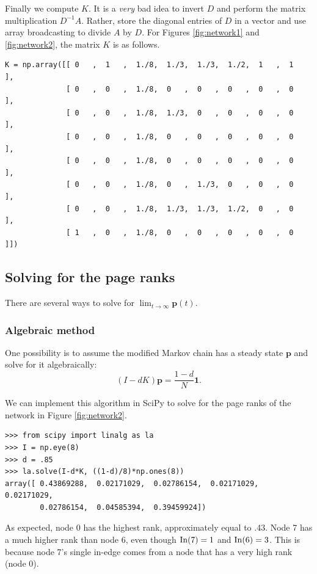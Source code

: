 Finally we compute $K$.
It is a \emph{very} bad idea to invert $D$ and perform the matrix multiplication $D^{-1}A$.
Rather, store the diagonal entries of $D$ in a vector and use array broadcasting to divide $A$ by $D$.
For Figures \ref{fig:network1} and \ref{fig:network2}, the matrix $K$ is as follows.

\begin{lstlisting}
K = np.array([[ 0   ,  1   ,  1./8,  1./3,  1./3,  1./2,  1   ,  1   ],
              [ 0   ,  0   ,  1./8,  0   ,  0   ,  0   ,  0   ,  0   ],
              [ 0   ,  0   ,  1./8,  1./3,  0   ,  0   ,  0   ,  0   ],
              [ 0   ,  0   ,  1./8,  0   ,  0   ,  0   ,  0   ,  0   ],
              [ 0   ,  0   ,  1./8,  0   ,  0   ,  0   ,  0   ,  0   ],
              [ 0   ,  0   ,  1./8,  0   ,  1./3,  0   ,  0   ,  0   ],
              [ 0   ,  0   ,  1./8,  1./3,  1./3,  1./2,  0   ,  0   ],
              [ 1   ,  0   ,  1./8,  0   ,  0   ,  0   ,  0   ,  0   ]])
\end{lstlisting}


\subsection*{Solving for the page ranks}
There are several ways to solve for $\lim_{t \to \infty} \mathbf{p}(t)$.
\subsubsection*{Algebraic method}
One possibility is to assume the modified Markov chain has a steady state $\mathbf{p}$ and solve for it algebraically:
\begin{equation}\label{equ:matrix_solve}
(I-dK)\mathbf{p} = \frac{1-d}{N} \mathbf{1}.
\end{equation}

We can implement this algorithm in SciPy to solve for the page ranks of the network in Figure \ref{fig:network2}.
\begin{lstlisting}
>>> from scipy import linalg as la
>>> I = np.eye(8)
>>> d = .85
>>> la.solve(I-d*K, ((1-d)/8)*np.ones(8))
array([ 0.43869288,  0.02171029,  0.02786154,  0.02171029,  0.02171029,
        0.02786154,  0.04585394,  0.39459924])
\end{lstlisting}
As expected, node 0 has the highest rank, approximately equal to .43. 
Node 7 has a much higher rank than node 6, even though $\operatorname{In}(7)=1$ and $\operatorname{In}(6)=3$. 
This is because node 7's single in-edge comes from a node that has a very high rank (node 0).

